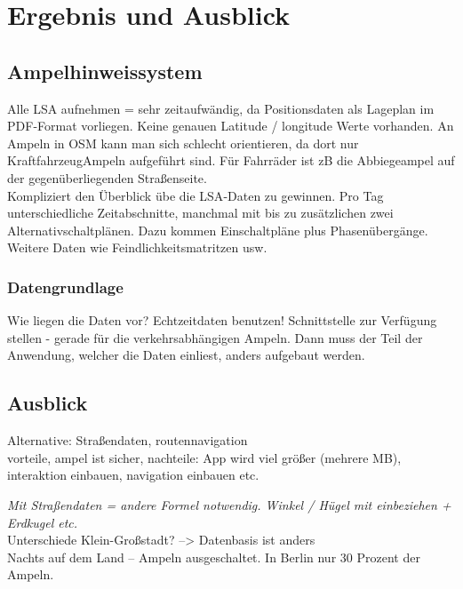 \chapter{\label{chap:fazit}Ergebnis und Ausblick}
\section{Ampelhinweissystem}
Alle LSA aufnehmen = sehr zeitaufwändig, da Positionsdaten als Lageplan im \gls{PDF}-Format vorliegen. Keine genauen Latitude / longitude Werte vorhanden. An Ampeln in OSM kann man sich schlecht orientieren, da dort nur KraftfahrzeugAmpeln aufgeführt sind. Für Fahrräder ist zB die Abbiegeampel auf der gegenüberliegenden Straßenseite. \\
Kompliziert den Überblick übe die \gls{LSA}-Daten zu gewinnen. Pro Tag unterschiedliche Zeitabschnitte, manchmal mit bis zu zusätzlichen zwei Alternativschaltplänen. Dazu kommen Einschaltpläne plus Phasenübergänge. Weitere Daten wie Feindlichkeitsmatritzen usw.
\subsection{Datengrundlage}
Wie liegen die Daten vor? Echtzeitdaten benutzen! 
Schnittstelle zur Verfügung stellen - gerade für die verkehrsabhängigen Ampeln. Dann muss der Teil der Anwendung, welcher die Daten einliest, anders aufgebaut werden.

\section{Ausblick}

Alternative: Straßendaten, routennavigation\\ vorteile, ampel ist sicher, nachteile:
App wird viel größer (mehrere MB),  interaktion einbauen, navigation einbauen etc. 

\textit{Mit Straßendaten = andere Formel notwendig. Winkel / Hügel mit einbeziehen + Erdkugel etc.}\\

Unterschiede Klein-Großstadt? --> Datenbasis ist anders\\
Nachts auf dem Land -- Ampeln ausgeschaltet. In Berlin nur 30 Prozent der Ampeln.
